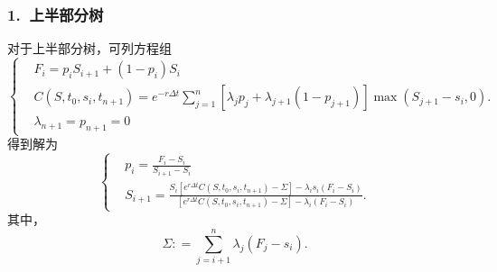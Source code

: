 \subsubsection{1. $\ $上半部分树}
对于上半部分树，可列方程组
\begin{equation*}
	\left\{
	\begin{aligned}
		& F_i = p_iS_{i+1}+(1-p_i)S_i \nonumber\\
		& C(S,t_0,s_i,t_{n+1}) = e^{-r \Delta t}\sum_{j=1}^{n} \left[\lambda_jp_j+\lambda_{j+1}(1-p_{j+1})\right]\max(S_{j+1}-s_i,0).\nonumber \\
		& \lambda_{n+1} = p_{n+1}=0 \nonumber
	\end{aligned}
	\right.
\end{equation*}
得到解为
\begin{equation}
	\label{eq4}
	\left\{
	\begin{aligned}
		& p_i = \frac{F_i-S_i}{S_{i+1}-S_i }\\
		& S_{i+1} = \frac{S_i\left[e^{r\Delta t}C(S,t_0,s_i,t_{n+1}) -\Sigma \right]-\lambda_is_i(F_i-S_i)}{\left[e^{r\Delta t}C(S,t_0,s_i,t_{n+1}) -\Sigma \right]-\lambda_i(F_i-S_i)}.
	\end{aligned}
	\right.
\end{equation}
其中，
$$ \Sigma: = \sum_{j=i+1}^n \lambda_j (F_j-s_i).$$

